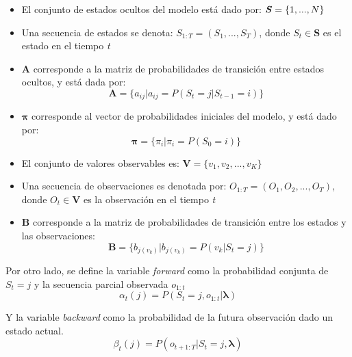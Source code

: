 \begin{itemize}

\item El conjunto de estados ocultos del modelo est\'a dado por: $\textbf{\textit{S}}=\lbrace 1,...,N \rbrace$

\item Una secuencia de estados se denota: $S_{1:T}=(S_{1},...,S_{T})$, donde $S_{t} \in \textbf{S}$ es el estado en el tiempo \textit{t}

\item \textbf{A} corresponde a la matriz de probabilidades de transici\'on entre estados ocultos, y est\'a dada por:
\begin{equation}
\textbf{A} = \lbrace a_{ij} \vert a_{ij} = P(S_{t} = j \vert S_{t-1} = i) \rbrace
\end{equation}

\item $\boldsymbol\pi$ corresponde al vector de probabilidades iniciales del modelo, y est\'a dado por: 
\begin{equation}
\boldsymbol\pi = \lbrace \pi_{i} \vert \pi_{i} = P(S_{0} = i) \rbrace
\end{equation}

\item El conjunto de valores observables es: $\textbf{V} = \lbrace v_{1}, v_{2},...,v_{K} \rbrace$

\item Una secuencia de observaciones es denotada por: $O_{1:T} = (O_{1},O_{2},...,O_{T})$, donde $O_{t} \in \textbf{V}$ es la observaci\'on en el tiempo \textit{t}

\item \textbf{B} corresponde a la matriz de probabilidades de transici\'on entre los estados y las observaciones:
\begin{equation}
\textbf{B} = \lbrace b_{j(v_{k})} \vert b_{j(v_{k})} = P(v_{k} \vert S_{t} = j) \rbrace
\end{equation}

\end{itemize}


Por otro lado, se define la variable \textit{forward} como la probabilidad conjunta de $S_{t}=j$ y la secuencia parcial observada $o_{1:t}$
\begin{equation}
\alpha_{t}(j) = P(S_{t} = j, o_{1:t} \vert \boldsymbol\lambda)
\end{equation}

Y la variable \textit{backward} como la probabilidad de la futura observaci\'on dado un estado actual.
\begin{equation}
\beta_{t}(j) = P(o_{t+1:T} \vert S_{t} = j, \boldsymbol\lambda)
\end{equation}


